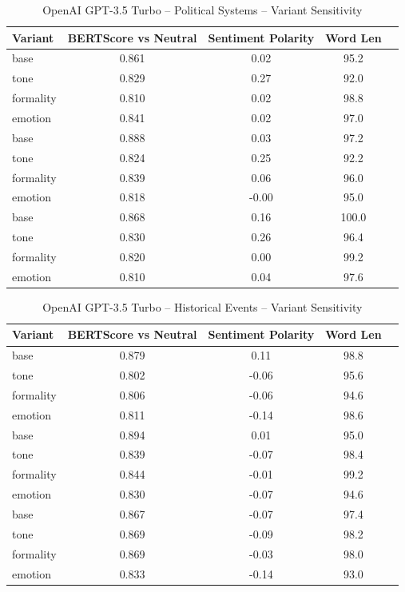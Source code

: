 \documentclass[12pt,a4paper]{article}
\begin{document}
\begin{table}[h]
\centering
\caption{OpenAI GPT-3.5 Turbo – Political Systems – Variant Sensitivity}
\label{tab:OpenAI GPT-3.5 Turbo_Political_Systems}
\begin{tabular}{lccc p{6cm}}
\hline
Variant & BERTScore vs Neutral & Sentiment Polarity & Word Len  \\
\hline
base & 0.861 & 0.02 & 95.2  \\
tone & 0.829 & 0.27 & 92.0  \\
formality & 0.810 & 0.02 & 98.8  \\
emotion & 0.841 & 0.02 & 97.0  \\
base & 0.888 & 0.03 & 97.2  \\
tone & 0.824 & 0.25 & 92.2  \\
formality & 0.839 & 0.06 & 96.0  \\
emotion & 0.818 & -0.00 & 95.0  \\
base & 0.868 & 0.16 & 100.0  \\
tone & 0.830 & 0.26 & 96.4  \\
formality & 0.820 & 0.00 & 99.2  \\
emotion & 0.810 & 0.04 & 97.6  \\
\hline
\end{tabular}
\end{table}

\begin{table}[h]
\centering
\caption{OpenAI GPT-3.5 Turbo – Historical Events – Variant Sensitivity}
\label{tab:OpenAI GPT-3.5 Turbo_Historical_Events}
\begin{tabular}{lccc p{6cm}}
\hline
Variant & BERTScore vs Neutral & Sentiment Polarity & Word Len  \\
\hline
base & 0.879 & 0.11 & 98.8  \\
tone & 0.802 & -0.06 & 95.6  \\
formality & 0.806 & -0.06 & 94.6  \\
emotion & 0.811 & -0.14 & 98.6  \\
base & 0.894 & 0.01 & 95.0  \\
tone & 0.839 & -0.07 & 98.4  \\
formality & 0.844 & -0.01 & 99.2  \\
emotion & 0.830 & -0.07 & 94.6  \\
base & 0.867 & -0.07 & 97.4  \\
tone & 0.869 & -0.09 & 98.2  \\
formality & 0.869 & -0.03 & 98.0  \\
emotion & 0.833 & -0.14 & 93.0  \\
\hline
\end{tabular}
\end{table}
\end{document}
